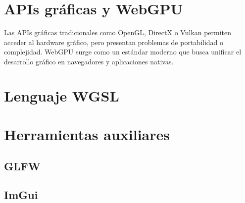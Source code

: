 \section{APIs gráficas y WebGPU}
Las APIs gráficas tradicionales como OpenGL, DirectX o Vulkan permiten acceder al hardware gráfico, pero presentan problemas de portabilidad o complejidad. WebGPU surge como un estándar moderno que busca unificar el desarrollo gráfico en navegadores y aplicaciones nativas.

\section{Lenguaje WGSL}

\section{Herramientas auxiliares}
\subsection{GLFW}

\subsection{ImGui}
